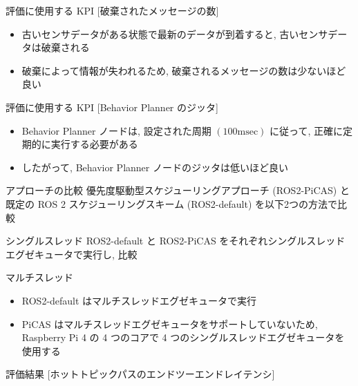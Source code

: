 \begin{frame}{評価に使用する KPI [破棄されたメッセージの数]}
    \begin{itemize}
        \item 古いセンサデータがある状態で最新のデータが到着すると, 古いセンサデータは破棄される
        \item 破棄によって情報が失われるため, 破棄されるメッセージの数は少ないほど良い
    \end{itemize}
\end{frame}

\begin{frame}{評価に使用する KPI [Behavior Planner のジッタ]}
    \begin{itemize}
        \item Behavior Planner ノードは, 設定された周期 $(100 \mathrm{msec})$ に従って, 正確に定期的に実行する必要がある
        \item したがって, Behavior Planner ノードのジッタは低いほど良い
    \end{itemize}
\end{frame}

\begin{frame}{アプローチの比較}
    \vspace{-1mm}
    優先度駆動型スケジューリングアプローチ (ROS2-PiCAS) と既定の ROS 2 スケジューリングスキーム (ROS2-default) を以下2つの方法で比較
    \vspace{-1mm}
    \begin{block}{シングルスレッド}
        ROS2-default と ROS2-PiCAS をそれぞれシングルスレッドエグゼキュータで実行し, 比較
    \end{block}
    \begin{block}{マルチスレッド}
        \begin{itemize}
            \item ROS2-default はマルチスレッドエグゼキュータで実行
            \item PiCAS はマルチスレッドエグゼキュータをサポートしていないため, Raspberry Pi 4 の 4 つのコアで 4 つのシングルスレッドエグゼキュータを使用する
        \end{itemize}
    \end{block}
\end{frame}

\begin{frame}{評価結果 [ホットトピックパスのエンドツーエンドレイテンシ]}
\end{frame}

